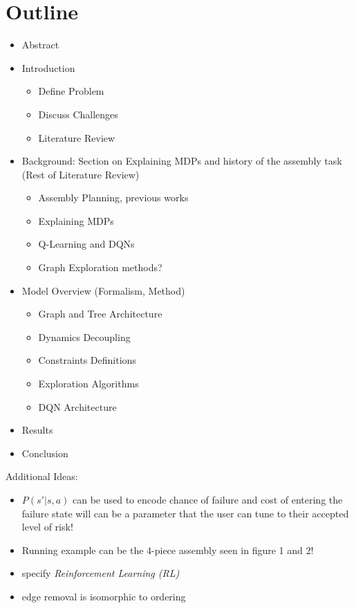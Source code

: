 \documentclass{article}
\begin{document}
\section{Outline}
\begin{itemize}
 \item Abstract
 \item Introduction
 \begin{itemize}
     \item Define Problem
     \item Discuss Challenges
     \item Literature Review
 \end{itemize}
 \item Background: Section on Explaining MDPs and history of the assembly task (Rest of Literature Review)
 \begin{itemize}
     \item Assembly Planning, previous works
     \item Explaining MDPs
     \item Q-Learning and DQNs
     \item Graph Exploration methods?
 \end{itemize}
 \item Model Overview (Formalism, Method)
 \begin{itemize}
     \item Graph and Tree Architecture
     \item Dynamics Decoupling
     \item Constraints Definitions
     \item Exploration Algorithms
     \item DQN Architecture
 \end{itemize}
 \item Results
 \item Conclusion
\end{itemize}

Additional Ideas: 
\begin{itemize}
 \item $P(s'|s,a)$ can be used to encode chance of failure and cost of entering the failure state will can be a parameter that the user can tune to their accepted level of risk!
 \item Running example can be the 4-piece assembly seen in figure 1 and 2!
 \item specify \emph{Reinforcement Learning (RL)}
 \item edge removal is isomorphic to ordering
\end{itemize}
\end{document}
